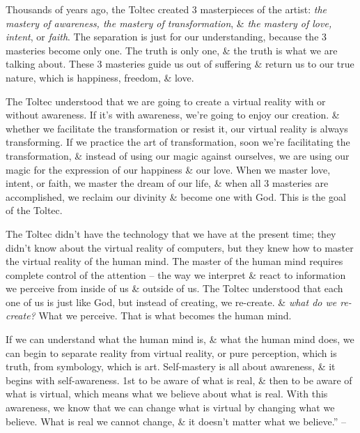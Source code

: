 \documentclass{article}
\numberwithin{equation}{section}
\begin{document}
Thousands of years ago, the Toltec created 3 masterpieces of the artist: \textit{the mastery of awareness, the mastery of transformation}, \& \textit{the mastery of love, intent}, or \textit{faith}. The separation is just for our understanding, because the 3 masteries become only one. The truth is only one, \& the truth is what we are talking about. These 3 masteries guide us out of suffering \& return us to our true nature, which is happiness, freedom, \& love.

The Toltec understood that we are going to create a virtual reality with or without awareness. If it's with awareness, we're going to enjoy our creation. \& whether we facilitate the transformation or resist it, our virtual reality is always transforming. If we practice the art of transformation, soon we're facilitating the transformation, \& instead of using our magic against ourselves, we are using our magic for the expression of our happiness \& our love. When we master love, intent, or faith, we master the dream of our life, \& when all 3 masteries are accomplished, we reclaim our divinity \& become one with God. This is the goal of the Toltec.

The Toltec didn't have the technology that we have at the present time; they didn't know about the virtual reality of computers, but they knew how to master the virtual reality of the human mind. The master of the human mind requires complete control of the attention -- the way we interpret \& react to information we perceive from inside of us \& outside of us. The Toltec understood that each one of us is just like God, but instead of creating, we re-create. \& \textit{what do we re-create?} What we perceive. That is what becomes the human mind.

If we can understand what the human mind is, \& what the human mind does, we can begin to separate reality from virtual reality, or pure perception, which is truth, from symbology, which is art. Self-mastery is all about awareness, \& it begins with self-awareness. 1st to be aware of what is real, \& then to be aware of what is virtual, which means what we believe about what is real. With this awareness, we know that we can change what is virtual by changing what we believe. What is real we cannot change, \& it doesn't matter what we believe.'' -- \cite[pp. 27--32]{Ruiz_Ruiz2011}

\end{document}
